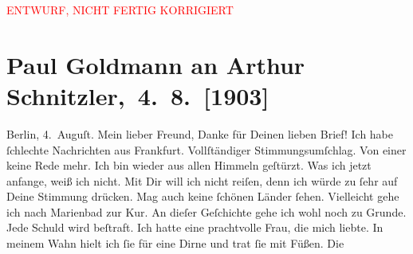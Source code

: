 
\begin{center}
            \textcolor{red}{ENTWURF, NICHT FERTIG KORRIGIERT}
                      \end{center}
            
         
         \renewcommand{\erwaehntePersonen}{Personen: Theodore Rottenberg, Olga Schnitzler}
         \renewcommand{\erwaehnteOrte}{Orte: Berlin, Frankfurt am Main, Marienbad, Wien}
         \renewcommand{\erwaehnteWerke}{}
               \section[ Paul Goldmann an Arthur Schnitzler, 4. 8. {[}1903{]}]{ Paul Goldmann an Arthur Schnitzler, 4. 8. {[}1903{]}}\nopagebreak{}\rehead{ }\begin{ledgroupsized}[t]{13cm}\normalsize\beginnumbering \toendnotes[C]{\smallbreak\pagebreak[2]} 
\toendnotes[C]{\smallbreak}\pstart
           \centering{}{\pb}Berlin, 4. Auguſt.\pend
           \pstart{}Mein lieber Freund,\pend\pstart
           Danke für Deinen lieben Brief!\pend
           \pstart
           Ich habe ſchlechte Nachrichten aus Frankfurt.
               Vollſtändiger Stimmungsumſchlag. Von einer \label{K_L03380-1v}\label{K_L03380-1h} keine Rede mehr.\pend
           \pstart
           Ich bin wieder aus allen Himmeln geſtürzt. Was ich jetzt anfange, weiß ich nicht. Mit
               Dir will ich nicht reiſen, denn ich würde zu ſehr auf Deine Stimmung drücken. Mag
               auch keine ſchönen Länder ſehen. Vielleicht gehe ich nach Marienbad zur Kur.\pend
           \pstart
           An dieſer Geſchichte gehe ich wohl noch zu Grunde. Jede Schuld wird beſtraft. Ich
               hatte eine prachtvolle Frau,
               die {\pb}mich liebte. In meinem Wahn hielt ich ſie für eine Dirne und trat ſie mit Füßen. Die

\end{ledgroupsized}
